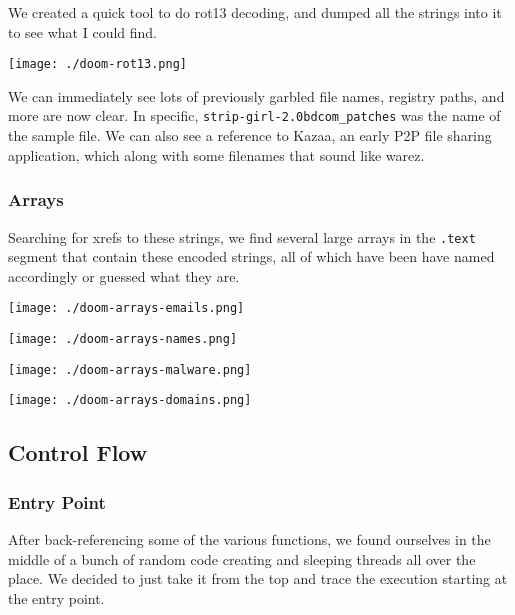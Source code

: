 \documentclass[11pt]{article}
\begin{document}
We created a quick tool to do rot13 decoding, and dumped all the
strings into it to see what I could find.

\begin{center}
\texttt{[image: ./doom-rot13.png]}
\end{center}

We can immediately see lots of previously garbled file names, registry
paths, and more are now clear. In specific,
\texttt{strip-girl-2.0bdcom\_patches} was the name of the sample file. We can
also see a reference to Kazaa, an early P2P file sharing application,
which along with some filenames that sound like warez.
\subsubsection{Arrays}
\label{sec:orgf091f85}
Searching for xrefs to these strings, we find several large arrays in
the \texttt{.text} segment that contain these encoded strings, all of which
have been have named accordingly or guessed what they are.

\begin{center}
\texttt{[image: ./doom-arrays-emails.png]}
\end{center}

\begin{center}
\texttt{[image: ./doom-arrays-names.png]}
\end{center}

\begin{center}
\texttt{[image: ./doom-arrays-malware.png]}
\end{center}

\begin{center}
\texttt{[image: ./doom-arrays-domains.png]}
\end{center}
\subsection{Control Flow}
\label{sec:org35b2fa6}
\subsubsection{Entry Point}
\label{sec:org844a1f4}
After back-referencing some of the various functions, we found
ourselves in the middle of a bunch of random code creating and
sleeping threads all over the place. We decided to just take it from
the top and trace the execution starting at the entry point.
\end{document}
